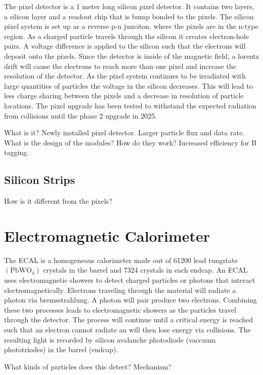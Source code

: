The pixel detector is a 1 meter long silicon pixel detector. It contains two layers, a silicon layer and a readout chip that is bump bonded to the pixels. The silicon pixel system is set up as a reverse p-n junciton, where the pixels are in the n-type region. As a charged particle travels through the silicon it creates electron-hole pairs. A voltage difference is applied to the silicon such that the electrons will deposit onto the pixels. Since the detector is inside of the magnetic field, a lorentz drift will cause the electrons to reach more than one pixel and increase the resolution of the detector. As the pixel system continues to be irradiated with large quantities of particles the voltage in the silicon decreases. This will lead to less charge sharing between the pixels and a decrease in resolution of particle locations. The pixel upgrade has been tested to withstand the expected radiation from collisions until the phase 2 upgrade in 2025. 

What is it?
Newly installed pixel detector. Larger particle flux and data rate. What is the design of the modules? How do they work?
Increased efficiency for B tagging.

\subsection{Silicon Strips}
\label{subsec:Strips}

How is it different from the pixels?

\section{Electromagnetic Calorimeter}
\label{sec:ECAL}

The ECAL is a homogeneous calorimeter made out of 61200 lead tungstate $(\text{PbWO}_4)$ crystals in the barrel and 7324 crystals in each endcap. An ECAL uses electromagnetic showers to detect charged particles or photons that interact electromagnetically. Electrons traveling through the material will radiate a photon via bremsstrahlung. A photon will pair produce two electrons. Combining these two processes leads to electromagnetic showers as the particles travel through the detector. The process will continue until a critical energy is reached such that an electron cannot radiate an will then lose energy via collisions. The resulting light is recorded by silicon avalanche photodiode (vaccuum phototriodes) in the barrel (endcap). 

What kinds of particles does this detect? Mechanism?

